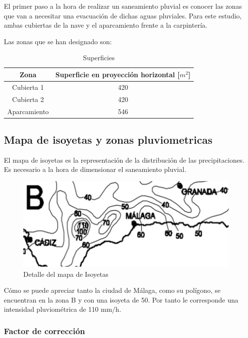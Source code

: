 \documentclass[../main.tex]{subfiles}
\begin{document}
El primer paso a la hora de realizar un saneamiento pluvial es conocer las zonas que van a necesitar una evacuación de dichas aguas pluviales. Para este estudio, ambas cubiertas de la nave y el aparcamiento frente a la carpintería. 

Las zonas que se han designado son:

\begin{table}[H]
    \centering
    \begin{tabular}{c|c}
         Zona & Superficie en proyección horizontal [$m^2$] \\ \hline
         Cubierta 1 & 420 \\
         Cubierta 2 &  420 \\
         Aparcamiento & 546 \\
    \end{tabular}
    \caption{Superficies}
\end{table}

\subsection{Mapa de isoyetas y zonas pluviometricas}

El mapa de isoyetas es la representación de la distribución de las precipitaciones. Es necesario a la hora de dimensionar el saneamiento pluvial. 

\begin{figure}[H]
    \centering
    \includegraphics[width=1\linewidth]{Imagenes/detalleisoyetas.png}
    \caption{Detalle del mapa de Isoyetas}
\end{figure}

Cómo se puede apreciar tanto la ciudad de Málaga, como su polígono, se encuentran en la zona B y con una isoyeta de 50. Por tanto le corresponde una intensidad pluviométrica de 110 mm/h.

\subsubsection{Factor de corrección}
\end{document}
